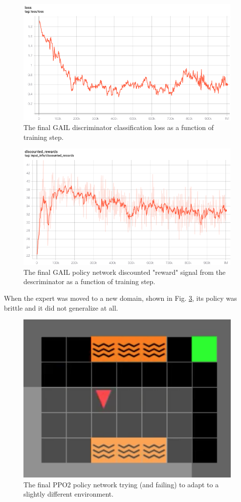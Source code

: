 \begin{figure}[htbp]
\centerline{\includegraphics[width=\linewidth]{Figures/gail_discriminator_loss.png}}
\caption{The final GAIL discriminator classification loss as a function of training step.}
\label{fig: gail_discrim_loss}
\end{figure}

\begin{figure}[htbp]
\centerline{\includegraphics[width=\linewidth]{Figures/gail_policy_net_reward_signal.png}}
\caption{The final GAIL policy network discounted "reward" signal from the descriminator as a function of training step.}
\label{fig: gail_policy_rew}
\end{figure}

When the expert was moved to a new domain, shown in Fig. \ref{fig: ppo2_generlaization}, its policy was brittle and it did not generalize at all.

\begin{figure}[htbp]
\centerline{\includegraphics[width=\linewidth]{Figures/new_env.png}}
\caption{The final PPO2 policy network trying (and failing) to adapt to a slightly different environment.}
\label{fig: ppo2_generlaization}
\end{figure}